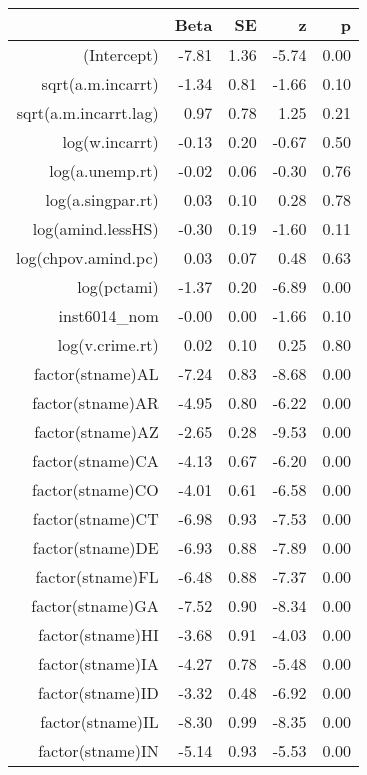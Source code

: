 \begin{table}[ht]
\centering
\begin{tabular}{rrrrr}
  \hline
 & Beta & SE & z & p \\ 
  \hline
(Intercept) & -7.81 & 1.36 & -5.74 & 0.00 \\ 
  sqrt(a.m.incarrt) & -1.34 & 0.81 & -1.66 & 0.10 \\ 
  sqrt(a.m.incarrt.lag) & 0.97 & 0.78 & 1.25 & 0.21 \\ 
  log(w.incarrt) & -0.13 & 0.20 & -0.67 & 0.50 \\ 
  log(a.unemp.rt) & -0.02 & 0.06 & -0.30 & 0.76 \\ 
  log(a.singpar.rt) & 0.03 & 0.10 & 0.28 & 0.78 \\ 
  log(amind.lessHS) & -0.30 & 0.19 & -1.60 & 0.11 \\ 
  log(chpov.amind.pc) & 0.03 & 0.07 & 0.48 & 0.63 \\ 
  log(pctami) & -1.37 & 0.20 & -6.89 & 0.00 \\ 
  inst6014\_nom & -0.00 & 0.00 & -1.66 & 0.10 \\ 
  log(v.crime.rt) & 0.02 & 0.10 & 0.25 & 0.80 \\ 
  factor(stname)AL & -7.24 & 0.83 & -8.68 & 0.00 \\ 
  factor(stname)AR & -4.95 & 0.80 & -6.22 & 0.00 \\ 
  factor(stname)AZ & -2.65 & 0.28 & -9.53 & 0.00 \\ 
  factor(stname)CA & -4.13 & 0.67 & -6.20 & 0.00 \\ 
  factor(stname)CO & -4.01 & 0.61 & -6.58 & 0.00 \\ 
  factor(stname)CT & -6.98 & 0.93 & -7.53 & 0.00 \\ 
  factor(stname)DE & -6.93 & 0.88 & -7.89 & 0.00 \\ 
  factor(stname)FL & -6.48 & 0.88 & -7.37 & 0.00 \\ 
  factor(stname)GA & -7.52 & 0.90 & -8.34 & 0.00 \\ 
  factor(stname)HI & -3.68 & 0.91 & -4.03 & 0.00 \\ 
  factor(stname)IA & -4.27 & 0.78 & -5.48 & 0.00 \\ 
  factor(stname)ID & -3.32 & 0.48 & -6.92 & 0.00 \\ 
  factor(stname)IL & -8.30 & 0.99 & -8.35 & 0.00 \\ 
  factor(stname)IN & -5.14 & 0.93 & -5.53 & 0.00 \\ 

\end{tabular}
\end{table}
